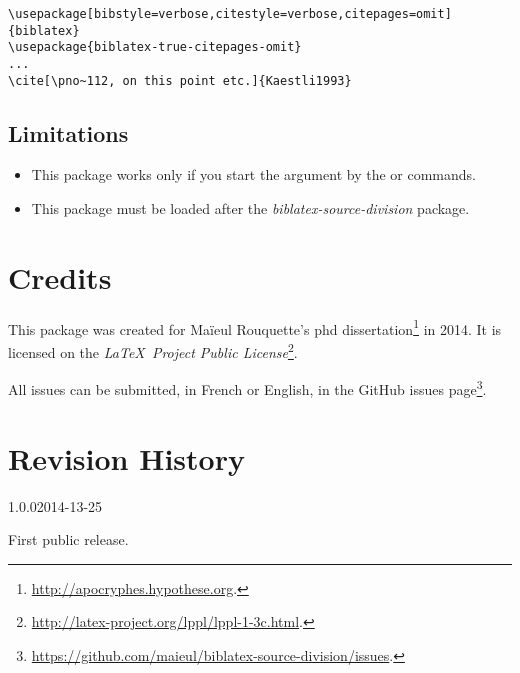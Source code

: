 \documentclass{ltxdockit}[2011/03/25]
\begin{document}
\begin{verbatim}
\usepackage[bibstyle=verbose,citestyle=verbose,citepages=omit]{biblatex}
\usepackage{biblatex-true-citepages-omit}
...
\cite[\pno~112, on this point etc.]{Kaestli1993}
\end{verbatim}


\citereset
{}
\begin{quotation}
\cite[\pno~112, on this point etc.]{Kaestli1993}
\end{quotation}

\subsection{Limitations}

\begin{itemize}
	\item This package works only if you start the    argument by the  or  commands.
	\item This package must be loaded after the \emph{biblatex-source-division} package.
\end{itemize}
\section{Credits}

This package was created for Maïeul Rouquette's phd dissertation\footnote{\url{http://apocryphes.hypothese.org}.} in 2014. It is licensed on the \emph{\LaTeX\ Project Public License}\footnote{\url{http://latex-project.org/lppl/lppl-1-3c.html}.}. 


All issues can be submitted, in French or English, in the GitHub issues page\footnote{\url{https://github.com/maieul/biblatex-source-division/issues}.}.



\section{Revision History}
\begin{changelog}




\begin{release}{1.0.0}{2014-13-25}
\item First public release.
\end{release}

\end{changelog}
\end{document}
